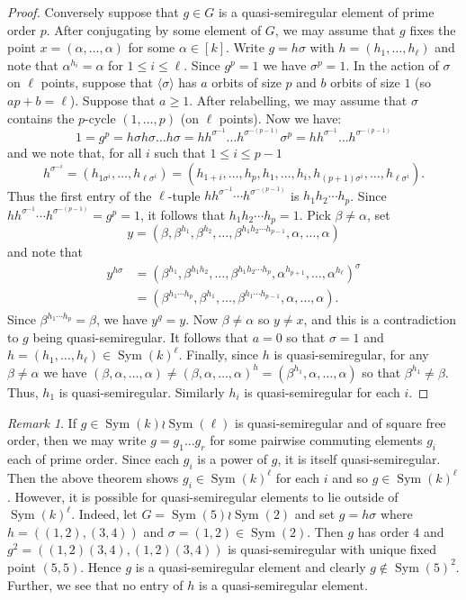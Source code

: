 \documentclass{article}
\theoremstyle{remark}
\newtheorem{rem}[thm]{Remark}
\theoremstyle{definition}
\DeclareMathOperator{\Sym}{Sym}
\newcommand{\qsr}{quasi-semiregular}
\newcommand{\qsre}{quasi-semiregular element}
\newcommand{\qsres}{quasi-semiregular elements}
\begin{document}
\begin{proof}
    Conversely suppose that $g\in G$ is a {\qsre} of prime order $p$. After conjugating by some element of $G$, we may assume that     $g$ fixes the point $x=(\alpha,\ldots,\alpha)$ for some $\alpha \in [k]$. Write $g=h\sigma$ with $h=(h_1,\ldots,h_\ell) $ and note that $\alpha^{h_i} = \alpha$ for $1\leqslant i \leqslant\ell$. Since $g^p=1$ we have $\sigma^p=1$. In the action of $\sigma$ on $\ell$ points, suppose that $\langle \sigma\rangle$ has $a$ orbits of size $p$ and $b$ orbits of size $1$ (so $ap+b=\ell$). 
    Suppose that $a\geqslant 1$. After relabelling, we may assume  that $\sigma$ contains the $p$-cycle $(1,\ldots,p)$ (on $\ell$ points). 
Now we have:  
\[
1=g^p=h\sigma h \sigma \ldots h\sigma =h h^{\sigma^{-1}} \ldots h^{\sigma^{-(p-1)}}   \sigma^p = h h^{\sigma^{-1}} \ldots h^{\sigma^{-(p-1)}} 
\]
and we note that, for all $i$ such that $1\leqslant i\leqslant p-1$
$$
h^{\sigma^{-i}}=(h_{1 \sigma^i},\ldots,h_{\ell\sigma^{i}})=(h_{1+i},\ldots,h_p,h_1,\ldots,h_i,h_{(p+1)\sigma^i},\ldots,h_{\ell \sigma^i}).
$$
Thus the first entry of the $\ell$-tuple $h h^{\sigma^{-1}} \cdots h^{\sigma^{-(p-1)}}$ is $h_1h_2\cdots h_p$. Since $h h^{\sigma^{-1}} \cdots h^{\sigma^{-(p-1)}} = g^p = 1$, it follows that $h_1h_2\cdots h_p=1$.
Pick  $\beta \neq \alpha$,  set 
    \[y= (\beta,\beta^{h_1},\beta^{h_2},\ldots,\beta^{h_1h_2\cdots h_{p-1}},\alpha,\ldots,\alpha)\]
    and note that  
\begin{align*}
       y^{h\sigma} &= (\beta^{h_1},\beta^{h_1h_2},\ldots,\beta^{h_1 h_2 \cdots h_p},\alpha^{h_{p+1}},\ldots,\alpha^{h_\ell})^\sigma \\
       & = (\beta^{h_1\cdots h_p},\beta^{h_1},\ldots,\beta^{h_1 \cdots h_{p-1}},\alpha,\ldots,\alpha).
\end{align*}
Since $\beta^{h_1\cdots h_p}=\beta$, we have $y^g = y$. Now $\beta \neq \alpha$ so $y\neq x$, and this is a contradiction to $g $ being {\qsr}. It follows that $a=0$ so that $\sigma =1$ and $h=(h_1,\ldots,h_\ell) \in \Sym(k)^\ell$. 
Finally, since $h$ is {\qsr}, for any $\beta \neq \alpha$ we have $(\beta,\alpha,\ldots,\alpha)\neq (\beta,\alpha,\ldots,\alpha)^h = (\beta^{h_1},\alpha,\ldots,\alpha) $ so that $\beta^{h_1}\neq  \beta$. Thus, $h_1$ is {\qsr}. Similarly $h_i$ is {\qsr} for each $i$.
\end{proof}



\begin{rem}
    If $g\in \Sym(k)\wr\Sym(\ell)$ is {\qsr} and of square free order, then we may write $g=g_1\ldots g_r$ for some pairwise commuting elements $g_i$ each of prime order. Since each $g_i$ is a power of $g$, it is itself \qsr. Then the above theorem shows $g_i \in \Sym(k)^\ell$ for each $i$ and so  $g\in \Sym(k)^\ell$. However, it is possible for {\qsres} to lie outside of $\Sym(k)^\ell$. Indeed, let $G=\Sym(5)\wr \Sym(2)$ and set $g=h\sigma$ where $h=((1,2),(3,4))$ and $\sigma =(1,2)\in \Sym(2)$. Then $g$ has order $4$ and $g^2=((1,2)(3,4),(1,2)(3,4))$ is {\qsr} with unique fixed point $(5,5)$. Hence $g$ is a {\qsre} and clearly $g\notin \Sym(5)^2$. Further, we see that no entry of $h$ is a {\qsre}.
\end{rem}
\end{document}
